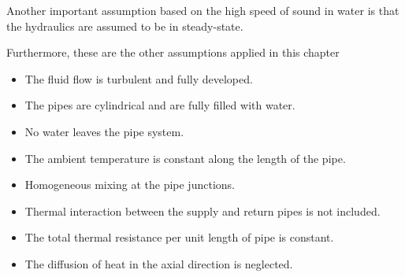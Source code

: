 Another important assumption based on the high speed of sound in water is that the hydraulics are assumed to be in steady-state. 

Furthermore, these are the other assumptions applied in this chapter \cite{MAURER2021244,sibeijn2025economic,KUNTUAROVA,PipePDE}
\begin{itemize}
    \item The fluid flow is turbulent and fully developed.
    \item The pipes are cylindrical and are fully filled with water.
    \item No water leaves the pipe system.
    \item The ambient temperature is constant along the length of the pipe.
    \item Homogeneous mixing at the pipe junctions.
    \item Thermal interaction between the supply and return pipes is not included.
    \item The total thermal resistance per unit length of pipe is constant.
    \item The diffusion of heat in the axial direction is neglected. 
\end{itemize}


